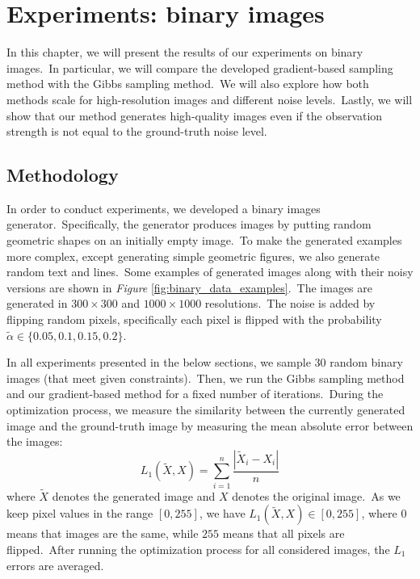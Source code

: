 \documentclass[shortabstract, english, lic]{iithesis}
\newcommand\numberedchapter[1]{\setlength\topskip{3cm}\chapter{#1}\setlength\topskip{0cm}}
\theoremstyle{default_theorem_style}\newtheorem{theorem}{Theorem}
\theoremstyle{default_theorem_style}\newtheorem{definition}{Definition}
\begin{document}
\numberedchapter{Experiments: binary images} \label{chapter:experiments}

In this chapter, we will present the results of our experiments on binary images.\ In particular, we will compare
the developed gradient-based sampling method with the Gibbs sampling method.\ We will also explore how both methods
scale for high-resolution images and different noise levels.\ Lastly, we will show that our method
generates high-quality images even if the observation strength is not equal to the ground-truth noise level.

\section{Methodology}

In order to conduct experiments, we developed a binary images generator.\ Specifically, the generator produces
images by putting random geometric shapes on an initially empty image.\ To make the generated examples more complex,
except generating simple geometric figures, we also generate random text and lines.\ Some examples of
generated images along with their noisy versions are shown in \textit{Figure}
\ref{fig:binary_data_examples}.\ The images are generated in $300{\times}300$ and $1000{\times}1000$
resolutions.\ The noise is added by flipping random pixels, specifically each pixel is flipped with the probability
$\tilde{\alpha} \in \{0.05, 0.1, 0.15, 0.2\}$.\newline

\noindent In all experiments presented in the below sections, we sample 30 random binary images
(that meet given constraints).\ Then, we run the Gibbs sampling method and our gradient-based method for a
fixed number of iterations.\ During the optimization process, we measure the similarity between the currently
generated image and the ground-truth image by measuring the mean absolute error between the images:
$$
L_1(\tilde{X}, X) = \sum\limits_{i = 1}^n \frac{|\tilde{X}_i - X_i|}{n}
$$
where $\tilde{X}$ denotes the generated image and $X$ denotes the original image.\ As we keep pixel values in the
range $[0, 255]$, we have $L_1(\tilde{X}, X) \in [0, 255]$, where $0$ means that images are the same, while
$255$ means that all pixels are flipped.\ After running the optimization process for all considered images, the
$L_1$ errors are averaged.\newline\newline\newline
\end{document}
